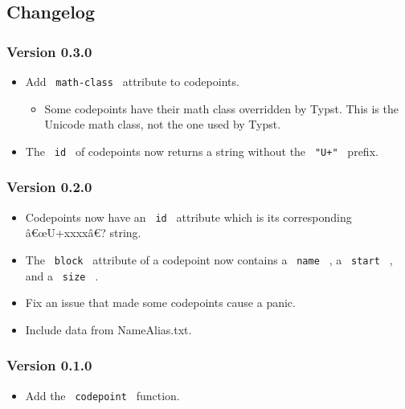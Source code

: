 \pandocbounded{}

\subsection{Changelog}\label{changelog}

\subsubsection{Version 0.3.0}\label{version-0.3.0}

\begin{itemize}
\item
  Add \texttt{\ math-class\ } attribute to codepoints.

  \begin{itemize}
  \tightlist
  \item
    Some codepoints have their math class overridden by Typst. This is
    the Unicode math class, not the one used by Typst.
  \end{itemize}
\item
  The \texttt{\ id\ } of codepoints now returns a string without the
  \texttt{\ "U+"\ } prefix.
\end{itemize}

\subsubsection{Version 0.2.0}\label{version-0.2.0}

\begin{itemize}
\item
  Codepoints now have an \texttt{\ id\ } attribute which is its
  corresponding â€œU+xxxxâ€? string.
\item
  The \texttt{\ block\ } attribute of a codepoint now contains a
  \texttt{\ name\ } , a \texttt{\ start\ } , and a \texttt{\ size\ } .
\item
  Fix an issue that made some codepoints cause a panic.
\item
  Include data from NameAlias.txt.
\end{itemize}

\subsubsection{Version 0.1.0}\label{version-0.1.0}

\begin{itemize}
\tightlist
\item
  Add the \texttt{\ codepoint\ } function.
\end{itemize}

